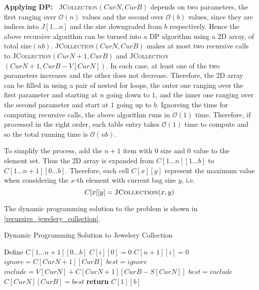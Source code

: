 \begin{homeworkProblem}
\pagebreak
\textbf{Applying DP:\ }
\textsc{JCollection}$(CurN, CurB)$ depends on two parameters, the first
ranging over $\mathcal{O}(n)$ values and the second over $\mathcal{O}(b)$
values, since they are indices into $J[1\ldots n]$ and the size downgraded
from $b$ respectively. Hence the above recursive algorithm can be turned
into a DP algorithm using a 2D array, of total size$(nb)$.
\textsc{JCollection}$(CurN, CurB)$ makes at most two recursive calls to
\textsc{JCollection}$(CurN+1, CurB)$ and
\textsc{JCollection}$(CurN+1, CurB-V[CurN])$.
In each case, at least one of the two parameters increases and the
other does not decrease. Therefore, the 2D array can be filled in
using a pair of nested for loops, the outer one ranging over the
first parameter and starting at $n$ going down to $1$, and the inner
one ranging over the second parameter and start at $1$ going up
to $b$. Ignoreing the time for computing recursive calls, the above
algorithm runs in $\mathcal{O}(1)$ time. Therefore, if processed
in the right order, each table entry takes $\mathcal{O}(1)$ time to
compute and so the total running time is $\mathcal{O}(nb)$.

To simplify the process, add the $n+1$ item with $0$ size and $0$ value
to the element set. Thus the 2D array is expanded from $C[1\ldots n][1\ldots b]$ to $C[1\ldots n+1][0\ldots b]$.
Therefore, each cell $C[x][y]$ represent the maximum value when considering the
$x$-th element with current bag size $y$, i.e. 
\[C[x][y] = \text{\textsc{JCollection}}(x,y)\]

The dynamic programming solution to the problem is shown in \cref{recursive_jewelery_collection}.

\begin{algorithm}[H]
    \caption{Dynamic Programming Solution to Jewelery Collection}\label{dp_jewelery_collection}
    \begin{algorithmic}[1]
            \State Define $C[1\ldots n+1][0\ldots b]$
                \State $C[i][0] = 0$
            \EndFor
                \State $C[n+1][i] = 0$
            \EndFor
                    \State $ignore = C[CurN+1][CurB]$
                    \State $best = ignore$
                        \State $include = V[CurN] + C[CurN+1][CurB-S[CurN]]$
                            \State $best = include$
                        \EndIf
                    \EndIf
                    \State $C[CurN][CurB] = best$
                \EndFor
            \EndFor
            \State \textbf{return }$C[1][b]$
        \EndProcedure
    \end{algorithmic}
\end{algorithm}
\end{homeworkProblem}
